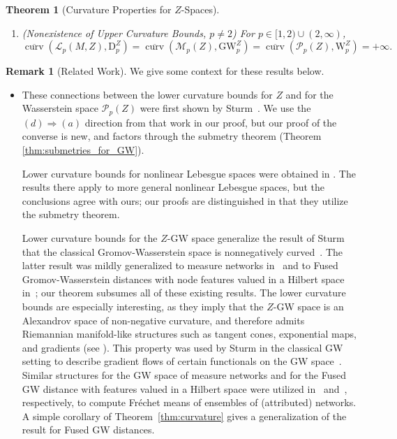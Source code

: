 \documentclass{article}
\newtheorem{theorem}{Theorem}
\theoremstyle{definition}
\newtheorem{remark}[proposition]{Remark}
\newcommand{\M}{\mathcal{M}}
\newcommand{\MZp}{\M_p(Z)}
\newcommand{\dgwz}{\mathrm{GW}_p^Z}
\newcommand{\WZ}{\mathcal{P}_p(Z)}
\newcommand{\WZp}[1]{\mathcal{P}_{#1}(Z)}
\newcommand{\wz}{\mathrm{W}_p^Z}
\newcommand{\wzp}[1]{\mathrm{W}_{#1}^Z}
\newcommand{\Lp}{\mathcal{L}_p}
\newcommand{\dpz}{\mathrm{D}^Z_p}
\newcommand{\curvupper}{\overline{\operatorname{curv}}}
\begin{document}
\begin{theorem}[Curvature Properties for $Z$-Spaces]
\begin{enumerate}[label=(\arabic*)]
\begin{enumerate}
            \item $\displaystyle \curvupper(\WZp{2},\wzp{2}) = \left\{\begin{array}{rl}
            0 & \mbox{if $Z$ is isometric to an interval}  \\
            +\infty & \mbox{otherwise.}
            \end{array}\right.$ 
        \end{enumerate}
        \item (Nonexistence of Upper Curvature Bounds, $p \neq 2$) For $p \in [1,2) \cup (2,\infty)$,
        \[
        \curvupper(\Lp(M,Z),\dpz) = \curvupper(\MZp, \dgwz) = \curvupper(\WZ,\wz) = +\infty.
        \]
    \end{enumerate}
\end{theorem}


\begin{remark}[Related Work]\label{remark:related_work_curvature}
    We give some context for these results below.

\begin{itemize}
    \item[(1),(2)] These connections between the lower curvature bounds for $Z$ and for the Wasserstein space $\WZ$ were first shown by Sturm~\cite[Proposition 2.10]{Sturm2006geometryI}. We use the $(d) \Rightarrow (a)$ direction from that work in our proof, but our proof of the converse is new, and factors through the submetry theorem (Theorem \ref{thm:submetries_for_GW}). 
    
    Lower curvature bounds for nonlinear Lebesgue spaces were obtained in \cite[Theorem 4.15]{serieys2026nonlinear}. The results there apply to more general nonlinear Lebesgue spaces, but the conclusions agree with ours; our proofs are distinguished in that they utilize the submetry theorem.

    Lower curvature bounds for the $Z$-GW space generalize the result of Sturm that the classical Gromov-Wasserstein space is nonnegatively curved~\cite{sturm2020}. The latter result was  mildly generalized to measure networks in~\cite{chowdhury2020gromov} and to Fused Gromov-Wasserstein distances with node features valued in a Hilbert space in~\cite{zhang2024geometry}; our theorem  subsumes all of these existing results. The lower curvature bounds are especially interesting, as they imply that the $Z$-GW space is an Alexandrov space of non-negative curvature, and therefore admits Riemannian manifold-like structures such as tangent cones, exponential maps, and gradients (see \cite{plaut2001metric,sturm2020}). This property was used by Sturm in the classical GW setting to describe gradient flows of certain functionals on the GW space~\cite[Chapters 7 and 8]{sturm2020}. Similar structures for the GW space of measure networks and for the Fused GW distance with features valued in a Hilbert space were utilized in~\cite{chowdhury2020gromov} and~\cite{zhang2024geometry}, respectively, to compute Fr\'{e}chet means of ensembles of (attributed) networks. A simple corollary of Theorem~\ref{thm:curvature} gives a generalization of the result for Fused GW distances.


\end{itemize}
\end{remark}
\end{document}
